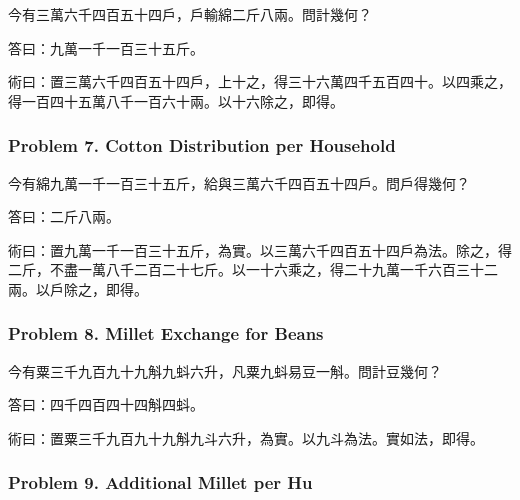 \documentclass[11pt,a4paper]{article}
\newcommand{\zh}[1]{{\CJKfamily{}#1}}
\begin{document}
\begin{problembox}[title=\zh{問}]
\zh{今有三萬六千四百五十四戶，戶輸綿二斤八兩。問計幾何？}
\end{problembox}
\begin{answerbox}[title=\zh{答}]
\zh{答曰：九萬一千一百三十五斤。}
\end{answerbox}
\begin{methodbox}[title=\zh{術}]
\zh{術曰：置三萬六千四百五十四戶，上十之，得三十六萬四千五百四十。以四乘之，得一百四十五萬八千一百六十兩。以十六除之，即得。}
\end{methodbox}

\subsubsection*{Problem 7. Cotton Distribution per Household}

\begin{problembox}[title=\zh{問}]
\zh{今有綿九萬一千一百三十五斤，給與三萬六千四百五十四戶。問戶得幾何？}
\end{problembox}
\begin{answerbox}[title=\zh{答}]
\zh{答曰：二斤八兩。}
\end{answerbox}
\begin{methodbox}[title=\zh{術}]
\zh{術曰：置九萬一千一百三十五斤，為實。以三萬六千四百五十四戶為法。除之，得二斤，不盡一萬八千二百二十七斤。以一十六乘之，得二十九萬一千六百三十二兩。以戶除之，即得。}
\end{methodbox}

\subsubsection*{Problem 8. Millet Exchange for Beans}

\begin{problembox}[title=\zh{問}]
\zh{今有粟三千九百九十九斛九蚪六升，凡粟九蚪易豆一斛。問計豆幾何？}
\end{problembox}
\begin{answerbox}[title=\zh{答}]
\zh{答曰：四千四百四十四斛四蚪。}
\end{answerbox}
\begin{methodbox}[title=\zh{術}]
\zh{術曰：置粟三千九百九十九斛九斗六升，為實。以九斗為法。實如法，即得。}
\end{methodbox}

\subsubsection*{Problem 9. Additional Millet per Hu}
\end{document}
